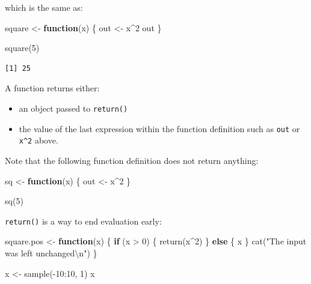 \documentclass[
]{book}
\newenvironment{Shaded}{\begin{snugshade}}{\end{snugshade}}
\newcommand{\ControlFlowTok}[1]{\textcolor[rgb]{0.13,0.29,0.53}{\textbf{#1}}}
\newcommand{\DecValTok}[1]{\textcolor[rgb]{0.00,0.00,0.81}{#1}}
\newcommand{\FunctionTok}[1]{\textcolor[rgb]{0.00,0.00,0.00}{#1}}
\newcommand{\NormalTok}[1]{#1}
\newcommand{\OtherTok}[1]{\textcolor[rgb]{0.56,0.35,0.01}{#1}}
\newcommand{\SpecialCharTok}[1]{\textcolor[rgb]{0.00,0.00,0.00}{#1}}
\newcommand{\StringTok}[1]{\textcolor[rgb]{0.31,0.60,0.02}{#1}}
\providecommand{\tightlist}{%
  \setlength{\itemsep}{0pt}\setlength{\parskip}{0pt}}
\begin{document}
which is the same as:

\begin{Shaded}
\begin{Highlighting}[]
\NormalTok{square }\OtherTok{\textless{}{-}} \ControlFlowTok{function}\NormalTok{(x) \{}
\NormalTok{  out }\OtherTok{\textless{}{-}}\NormalTok{ x}\SpecialCharTok{\^{}}\DecValTok{2}
\NormalTok{  out}
\NormalTok{\}}

\FunctionTok{square}\NormalTok{(}\DecValTok{5}\NormalTok{)}
\end{Highlighting}
\end{Shaded}

\begin{verbatim}
[1] 25
\end{verbatim}

A function returns either:

\begin{itemize}
\tightlist
\item
  an object passed to \texttt{return()}
\item
  the value of the last expression within the function definition such as \texttt{out} or \texttt{x\^{}2} above.
\end{itemize}

Note that the following function definition does not return anything:

\begin{Shaded}
\begin{Highlighting}[]
\NormalTok{sq }\OtherTok{\textless{}{-}} \ControlFlowTok{function}\NormalTok{(x) \{}
\NormalTok{  out }\OtherTok{\textless{}{-}}\NormalTok{ x}\SpecialCharTok{\^{}}\DecValTok{2}
\NormalTok{\}}

\FunctionTok{sq}\NormalTok{(}\DecValTok{5}\NormalTok{)}
\end{Highlighting}
\end{Shaded}

\texttt{return()} is a way to end evaluation early:

\begin{Shaded}
\begin{Highlighting}[]
\NormalTok{square.pos }\OtherTok{\textless{}{-}} \ControlFlowTok{function}\NormalTok{(x) \{}
  \ControlFlowTok{if}\NormalTok{ (x }\SpecialCharTok{\textgreater{}} \DecValTok{0}\NormalTok{) \{}
    \FunctionTok{return}\NormalTok{(x}\SpecialCharTok{\^{}}\DecValTok{2}\NormalTok{)}
\NormalTok{  \} }\ControlFlowTok{else}\NormalTok{ \{}
\NormalTok{    x}
\NormalTok{  \}}
  \FunctionTok{cat}\NormalTok{(}\StringTok{"The input was left unchanged}\SpecialCharTok{\textbackslash{}n}\StringTok{"}\NormalTok{)}
\NormalTok{\}}

\NormalTok{x }\OtherTok{\textless{}{-}} \FunctionTok{sample}\NormalTok{(}\SpecialCharTok{{-}}\DecValTok{10}\SpecialCharTok{:}\DecValTok{10}\NormalTok{, }\DecValTok{1}\NormalTok{)}
\NormalTok{x}
\end{Highlighting}
\end{Shaded}
\end{document}
